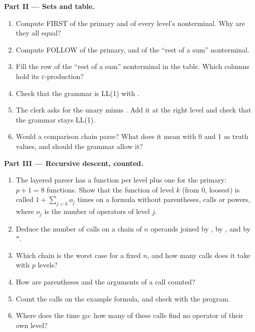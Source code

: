 \begin{problem}
\medskip\noindent\textbf{Part II --- Sets and table.}
\begin{enumerate}[resume]
\item Compute FIRST of the primary and of every level's nonterminal. Why are they all equal?
\item Compute FOLLOW of the primary, and of the ``rest of a sum'' nonterminal.
\item Fill the row of the ``rest of a sum'' nonterminal in the table. Which columns hold its $\varepsilon$-production?
\item Check that the grammar is LL(1) with .
\item The clerk asks for the unary minus . Add it at the right level and check that the grammar stays LL(1).
\item Would a comparison chain  parse? What does it mean with 0 and 1 as truth values, and should the grammar allow it?
\end{enumerate}

\medskip\noindent\textbf{Part III --- Recursive descent, counted.}
\begin{enumerate}[resume]
\item The layered parser has a function per level plus one for the primary: $p + 1 = 8$ functions. Show that the function of level $k$ (from 0, loosest) is called $1 + \sum_{j < k} o_j$ times on a formula without parentheses, calls or powers, where $o_j$ is the number of operators of level $j$.
\item Deduce the number of calls on a chain of $n$ operands joined by , by \code{+}, and by \texttt{\textasciicircum}.
\item Which chain is the worst case for a fixed $n$, and how many calls does it take with $p$ levels?
\item How are parentheses and the arguments of a call counted?
\item Count the calls on the example formula, and check with the program.
\item Where does the time go: how many of these calls find no operator of their own level?
\end{enumerate}


\end{problem}
